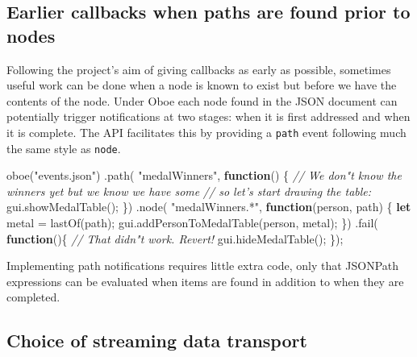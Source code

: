 \documentclass[12pt, ]{article}
\newenvironment{Shaded}{}{}
\newcommand{\KeywordTok}[1]{\textcolor[rgb]{0.00,0.44,0.13}{\textbf{{#1}}}}
\newcommand{\StringTok}[1]{\textcolor[rgb]{0.25,0.44,0.63}{{#1}}}
\newcommand{\CommentTok}[1]{\textcolor[rgb]{0.38,0.63,0.69}{\textit{{#1}}}}
\newcommand{\OtherTok}[1]{\textcolor[rgb]{0.00,0.44,0.13}{{#1}}}
\newcommand{\FunctionTok}[1]{\textcolor[rgb]{0.02,0.16,0.49}{{#1}}}
\newcommand{\NormalTok}[1]{{#1}}
\begin{document}
\subsection{Earlier callbacks when paths are found prior to
nodes}\label{earlier-callbacks-when-paths-are-found-prior-to-nodes}

Following the project's aim of giving callbacks as early as possible,
sometimes useful work can be done when a node is known to exist but
before we have the contents of the node. Under Oboe each node found in
the JSON document can potentially trigger notifications at two stages:
when it is first addressed and when it is complete. The API facilitates
this by providing a \texttt{path} event following much the same style as
\texttt{node}.

\begin{Shaded}
\begin{Highlighting}[]
\FunctionTok{oboe}\NormalTok{(}\StringTok{"events.json"}\NormalTok{)}
   \NormalTok{.}\FunctionTok{path}\NormalTok{( }\StringTok{"medalWinners"}\NormalTok{, }\KeywordTok{function}\NormalTok{() \{}
      \CommentTok{// We don"t know the winners yet but we know we have some }
      \CommentTok{// so let's start drawing the table:    }
      \OtherTok{gui}\NormalTok{.}\FunctionTok{showMedalTable}\NormalTok{();}
   \NormalTok{\})}
   \NormalTok{.}\FunctionTok{node}\NormalTok{( }\StringTok{"medalWinners.*"}\NormalTok{, }\KeywordTok{function}\NormalTok{(person, path) \{    }
      \KeywordTok{let} \NormalTok{metal = }\FunctionTok{lastOf}\NormalTok{(path);}
      \OtherTok{gui}\NormalTok{.}\FunctionTok{addPersonToMedalTable}\NormalTok{(person, metal);}
   \NormalTok{\})}
   \NormalTok{.}\FunctionTok{fail}\NormalTok{( }\KeywordTok{function}\NormalTok{()\{}
      \CommentTok{// That didn"t work. Revert!}
      \OtherTok{gui}\NormalTok{.}\FunctionTok{hideMedalTable}\NormalTok{();}
   \NormalTok{\});}
\end{Highlighting}
\end{Shaded}

Implementing path notifications requires little extra code, only that
JSONPath expressions can be evaluated when items are found in addition
to when they are completed.

\subsection{Choice of streaming data
transport}\label{choice-of-streaming-data-transport}
\end{document}
